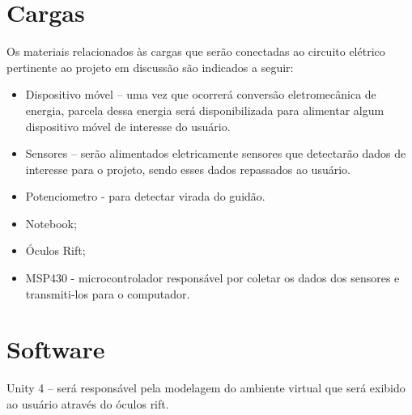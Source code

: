 \section{Cargas}

Os materiais relacionados às cargas que serão conectadas ao circuito elétrico pertinente ao projeto em discussão são indicados a seguir:

\begin{itemize}
\item Dispositivo móvel – uma vez que ocorrerá conversão eletromecânica de energia, parcela dessa energia será disponibilizada para alimentar algum
  dispositivo móvel de interesse do usuário.
\item Sensores – serão alimentados eletricamente sensores que detectarão dados de interesse para o projeto, sendo esses dados repassados ao usuário.
\item Potenciometro - para detectar virada do guidão.
\item Notebook;
\item Óculos Rift;
\item MSP430 - microcontrolador responsável por coletar os dados dos sensores e transmiti-los para o computador.
\end{itemize}

\section{Software}

Unity 4 – será responsável pela modelagem do ambiente virtual que será exibido ao usuário através do óculos rift.

